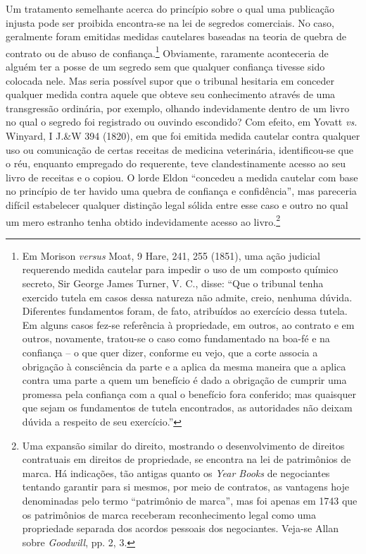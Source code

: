 Um tratamento semelhante acerca do princípio sobre o qual uma publicação
injusta pode ser proibida encontra-se na lei de segredos comerciais. No
caso, geralmente foram emitidas medidas cautelares baseadas na teoria de
quebra de contrato ou de abuso de confiança.\footnote{Em Morison
  \emph{versus} Moat, 9 Hare, 241, 255 (1851), uma ação judicial
  requerendo medida cautelar para impedir o uso de um composto químico
  secreto, Sir George James Turner, V. C., disse: ``Que o tribunal tenha
  exercido tutela em casos dessa natureza não admite, creio, nenhuma
  dúvida. Diferentes fundamentos foram, de fato, atribuídos ao exercício
  dessa tutela. Em alguns casos fez-se referência à propriedade, em
  outros, ao contrato e em outros, novamente, tratou-se o caso como
  fundamentado na boa-fé e na confiança -- o que quer dizer, conforme eu
  vejo, que a corte associa a obrigação à consciência da parte e a
  aplica da mesma maneira que a aplica contra uma parte a quem um
  benefício é dado a obrigação de cumprir uma promessa pela confiança
  com a qual o benefício fora conferido; mas quaisquer que sejam os
  fundamentos de tutela encontrados, as autoridades não deixam dúvida a
  respeito de seu exercício.''} Obviamente, raramente aconteceria de
alguém ter a posse de um segredo sem que qualquer confiança tivesse sido
colocada nele. Mas seria possível supor que o tribunal hesitaria em
conceder qualquer medida contra aquele que obteve seu conhecimento
através de uma transgressão ordinária, por exemplo, olhando
indevidamente dentro de um livro no qual o segredo foi registrado ou
ouvindo escondido? Com efeito, em Yovatt \emph{vs.} Winyard, I J.\&W 394
(1820), em que foi emitida medida cautelar contra qualquer uso ou
comunicação de certas receitas de medicina veterinária, identificou-se
que o réu, enquanto empregado do requerente, teve clandestinamente
acesso ao seu livro de receitas e o copiou. O lorde Eldon ``concedeu a
medida cautelar com base no princípio de ter havido uma quebra de
confiança e confidência'', mas pareceria difícil estabelecer qualquer
distinção legal sólida entre esse caso e outro no qual um mero estranho
tenha obtido indevidamente acesso ao livro.\footnote{Uma expansão
  similar do direito, mostrando o desenvolvimento de direitos
  contratuais em direitos de propriedade, se encontra na lei de
  patrimônios de marca. Há indicações, tão antigas quanto os \emph{Year
  Books} de negociantes tentando garantir para si mesmos, por meio de
  contratos, as vantagens hoje denominadas pelo termo ``patrimônio de
  marca'', mas foi apenas em 1743 que os patrimônios de marca receberam
  reconhecimento legal como uma propriedade separada dos acordos
  pessoais dos negociantes. Veja-se Allan sobre \emph{Goodwill}, pp. 2,
  3.}

